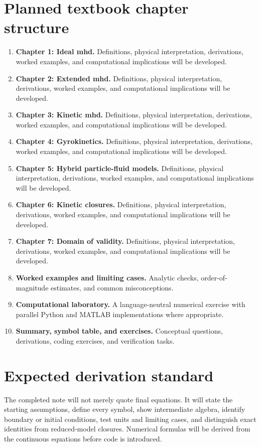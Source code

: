 \documentclass[11pt]{article}
\begin{document}
\section{Planned textbook chapter structure}
\begin{enumerate}[leftmargin=1.8em]
\item \textbf{Chapter 1: Ideal mhd.} Definitions, physical interpretation, derivations, worked examples, and computational implications will be developed.
\item \textbf{Chapter 2: Extended mhd.} Definitions, physical interpretation, derivations, worked examples, and computational implications will be developed.
\item \textbf{Chapter 3: Kinetic mhd.} Definitions, physical interpretation, derivations, worked examples, and computational implications will be developed.
\item \textbf{Chapter 4: Gyrokinetics.} Definitions, physical interpretation, derivations, worked examples, and computational implications will be developed.
\item \textbf{Chapter 5: Hybrid particle-fluid models.} Definitions, physical interpretation, derivations, worked examples, and computational implications will be developed.
\item \textbf{Chapter 6: Kinetic closures.} Definitions, physical interpretation, derivations, worked examples, and computational implications will be developed.
\item \textbf{Chapter 7: Domain of validity.} Definitions, physical interpretation, derivations, worked examples, and computational implications will be developed.
\item \textbf{Worked examples and limiting cases.} Analytic checks, order-of-magnitude estimates, and common misconceptions.
\item \textbf{Computational laboratory.} A language-neutral numerical exercise with parallel Python and MATLAB implementations where appropriate.
\item \textbf{Summary, symbol table, and exercises.} Conceptual questions, derivations, coding exercises, and verification tasks.
\end{enumerate}

\section{Expected derivation standard}
The completed note will not merely quote final equations. It will state the starting assumptions, define every symbol, show intermediate algebra, identify boundary or initial conditions, test units and limiting cases, and distinguish exact identities from reduced-model closures. Numerical formulas will be derived from the continuous equations before code is introduced.
\end{document}

